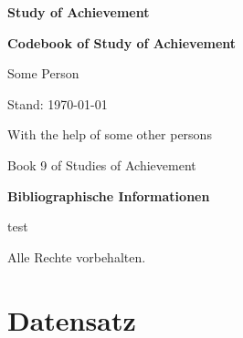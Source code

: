 \documentclass[paper=a4, hidelinks, twoside=false, numbers=noenddot]{scrbook}
\newlength{\sizesnd} %
\newlength{\sizevn} %
\newlength{\sizekat} %
\newlength{\adj} %
\newcommand*{\getlengths}[1]{%
\pgfmathsetmacro#1{(\the\hsize-\the\adj)/2}%
}
\newcounter{secDAT}
\begin{document}
\thispagestyle{empty}
\frontmatter %
\setlength{\aboverulesep}{0pt}
\setlength{\belowrulesep}{0pt}
\setlength{\extrarowheight}{0ex}
\settowidth{\adj}{00.0}
\addtolength{\sizesnd}{0.4cm}
\thispagestyle{empty}
\vspace*{75mm}
\begin{Huge}
\color{iqbrot} \textbf{Study of Achievement} \par \medskip
\end{Huge}
\begin{Large}
\textbf{Codebook of Study of Achievement}\par \bigskip
\end{Large}
\begin{large}
Some Person
\end{large}
\bigskip

\vfill
Stand: \today \par
With the help of some other persons\par
Book 9 of Studies of Achievement 

\pagebreak
\thispagestyle{empty}
\quad
\vfill

\textbf{Bibliographische Informationen} \par
test
\par \bigskip
Alle Rechte vorbehalten.
\cleardoublepage
\clearscrheadfoot
{}
\cfoot[\pagemark]{\pagemark}
\setcounter{page}{1}
\tableofcontents
\pagebreak
\clearscrheadfoot
\pagestyle{headings}
\ihead[\leftmark]{\leftmark \newline \rightmark}
\cfoot[\pagemark]{\pagemark}
\mainmatter %

\chapter{Datensatz}
\setcounter{secDAT}{\thepage}

\end{document}

